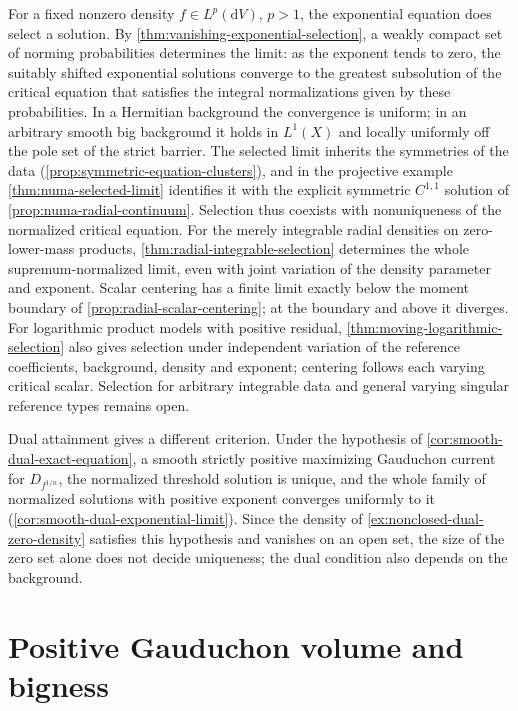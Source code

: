 For a fixed nonzero density $f\in L^p(\mathrm{d}V)$, $p>1$, the exponential equation does select a solution. By \cref{thm:vanishing-exponential-selection}, a weakly compact set of norming probabilities determines the limit: as the exponent tends to zero, the suitably shifted exponential solutions converge to the greatest subsolution of the critical equation that satisfies the integral normalizations given by these probabilities. In a Hermitian background the convergence is uniform; in an arbitrary smooth big background it holds in $L^1(X)$ and locally uniformly off the pole set of the strict barrier. The selected limit inherits the symmetries of the data (\cref{prop:symmetric-equation-clusters}), and in the projective example \cref{thm:numa-selected-limit} identifies it with the explicit symmetric $C^{1,1}$ solution of \cref{prop:numa-radial-continuum}. Selection thus coexists with nonuniqueness of the normalized critical equation. For the merely integrable radial densities on zero-lower-mass products, \cref{thm:radial-integrable-selection} determines the whole supremum-normalized limit, even with joint variation of the density parameter and exponent. Scalar centering has a finite limit exactly below the moment boundary of \cref{prop:radial-scalar-centering}; at the boundary and above it diverges. For logarithmic product models with positive residual, \cref{thm:moving-logarithmic-selection} also gives selection under independent variation of the reference coefficients, background, density and exponent; centering follows each varying critical scalar. Selection for arbitrary integrable data and general varying singular reference types remains open.

Dual attainment gives a different criterion. Under the hypothesis of \cref{cor:smooth-dual-exact-equation}, a smooth strictly positive maximizing Gauduchon current for $D_{f^{1/n}}$, the normalized threshold solution is unique, and the whole family of normalized solutions with positive exponent converges uniformly to it (\cref{cor:smooth-dual-exponential-limit}). Since the density of \cref{ex:nonclosed-dual-zero-density} satisfies this hypothesis and vanishes on an open set, the size of the zero set alone does not decide uniqueness; the dual condition also depends on the background.

\section{Positive Gauduchon volume and bigness}
\label{sec:gaud-volume-bigness}


